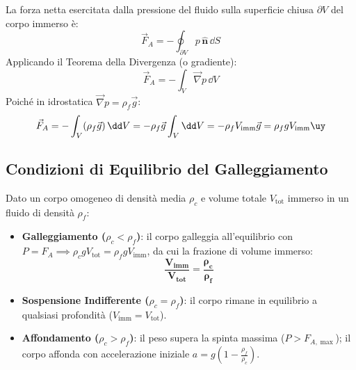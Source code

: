\begin{dimostrazione}
La forza netta esercitata dalla pressione del fluido sulla superficie chiusa $\partial V$ del corpo immerso è:
\begin{equation}
    \vec{F}_A = -\oint_{\partial V} p\,\hat{\bm{n}}\,\dd S
\end{equation}
Applicando il Teorema della Divergenza (o gradiente):
\begin{equation}
    \vec{F}_A = -\int_V \vec{\nabla}p\,\dd V
\end{equation}
Poiché in idrostatica $\vec{\nabla}p = \rho_f \vec{g}$:
\begin{equation}
    \vec{F}_A = -\int_V (\rho_f \vec{g})\,\dd V = -\rho_f \vec{g} \int_V \dd V = -\rho_f V_{\text{imm}}\vec{g} = \rho_f g V_{\text{imm}}\uy
\end{equation}
\end{dimostrazione}

\begin{center}
\end{center}

\subsection{Condizioni di Equilibrio del Galleggiamento}
Dato un corpo omogeneo di densità media $\rho_c$ e volume totale $V_{\text{tot}}$ immerso in un fluido di densità $\rho_f$:
\begin{itemize}
    \item \textbf{Galleggiamento ($\rho_c < \rho_f$)}: il corpo galleggia all'equilibrio con $P = F_A \implies \rho_c g V_{\text{tot}} = \rho_f g V_{\text{imm}}$, da cui la frazione di volume immerso:
    \begin{equation}
        \mathbf{\frac{V_{\text{imm}}}{V_{\text{tot}}} = \frac{\rho_c}{\rho_f}}
        \label{eq:frazione_immersa}
    \end{equation}
    \item \textbf{Sospensione Indifferente ($\rho_c = \rho_f$)}: il corpo rimane in equilibrio a qualsiasi profondità ($V_{\text{imm}} = V_{\text{tot}}$).
    \item \textbf{Affondamento ($\rho_c > \rho_f$)}: il peso supera la spinta massima ($P > F_{A,\max}$); il corpo affonda con accelerazione iniziale $a = g\left(1 - \frac{\rho_f}{\rho_c}\right)$.
\end{itemize}

